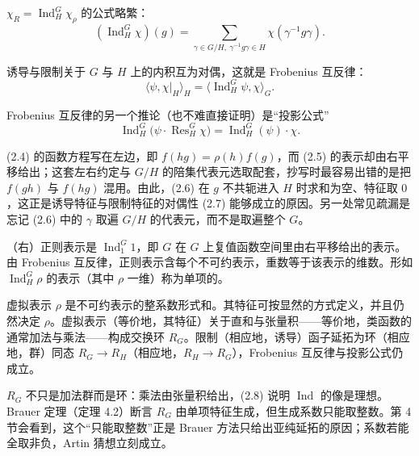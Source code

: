 $\chi_R=\operatorname{Ind}^{G}_{H}\chi_\rho$ 的公式略繁：
\begin{equation}\tag{2.6}\label{c4:eq:2.6}
(\operatorname{Ind}^{G}_{H}\chi)(g)=\sum_{\gamma\in G/H,\ \gamma^{-1}g\gamma\in H}\chi(\gamma^{-1}g\gamma).
\end{equation}

诱导与限制关于 $G$ 与 $H$ 上的内积互为对偶，这就是 Frobenius 互反律：
\begin{equation}\tag{2.7}\label{c4:eq:2.7}
\langle\psi,\chi|_{H}\rangle_{H}=\langle\operatorname{Ind}^{G}_{H}\psi,\chi\rangle_{G} .
\end{equation}

Frobenius 互反律的另一个推论（也不难直接证明）是“投影公式”
\begin{equation}\tag{2.8}\label{c4:eq:2.8}
\operatorname{Ind}^{G}_{H}\bigl(\psi\cdot\operatorname{Res}^{G}_{H}\chi\bigr)=\operatorname{Ind}^{G}_{H}(\psi)\cdot\chi .
\end{equation}

\begin{annote}
(2.4) 的函数方程写在左边，即 $f(hg)=\rho(h)f(g)$，而 (2.5) 的表示却由右平移给出；这套左右约定与 $G/H$ 的陪集代表元选取配套，抄写时最容易出错的是把 $f(gh)$ 与 $f(hg)$ 混用。由此，(2.6) 在 $g$ 不共轭进入 $H$ 时求和为空、特征取 $0$，这正是诱导特征与限制特征的对偶性 (2.7) 能够成立的原因。另一处常见疏漏是忘记 (2.6) 中的 $\gamma$ 取遍 $G/H$ 的代表元，而不是取遍整个 $G$。
\par\vspace{0.15em}{\raggedleft 【来源：Serre《Linear Representations of Finite Groups》§7.1--7.2（A）；Isaacs《Character Theory of Finite Groups》Ch.~5（A）】\par}
\end{annote}

（右）正则表示是 $\operatorname{Ind}^{G}_{1}1$，即 $G$ 在 $G$ 上复值函数空间里由右平移给出的表示。由 Frobenius 互反律，正则表示含每个不可约表示，重数等于该表示的维数。形如 $\operatorname{Ind}^{G}_{H}\rho$ 的表示（其中 $\rho$ 一维）称为单项的。

虚拟表示 $\rho$ 是不可约表示的整系数形式和。其特征可按显然的方式定义，并且仍然决定 $\rho$。虚拟表示（等价地，其特征）关于直和与张量积——等价地，类函数的通常加法与乘法——构成交换环 $R_G$。限制（相应地，诱导）函子延拓为环（相应地，群）同态 $R_G\to R_H$（相应地，$R_H\to R_G$），Frobenius 互反律与投影公式仍成立。

\begin{annote}
$R_G$ 不只是加法群而是环：乘法由张量积给出，(2.8) 说明 $\operatorname{Ind}$ 的像是理想。Brauer 定理（定理 4.2）断言 $R_G$ 由单项特征生成，但生成系数只能取整数。第 4 节会看到，这个“只能取整数”正是 Brauer 方法只给出亚纯延拓的原因；系数若能全取非负，Artin 猜想立刻成立。
\par\vspace{0.15em}{\raggedleft 【来源：Serre 前引书 Ch.~10（A）；Isaacs 前引书 Ch.~8（A）】\par}
\end{annote}

